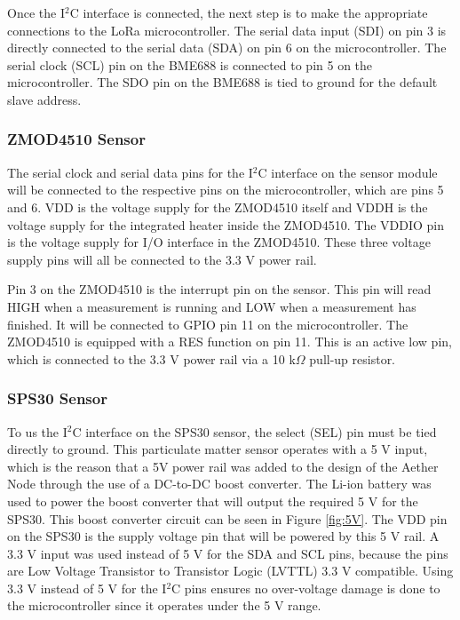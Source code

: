 \documentclass[conference]{IEEEtran}
\newcommand*{\iic}{I$^2$C\xspace}
\newcommand*{\kOhm}{k$\Omega$\xspace}
\begin{document}
 Once the \iic interface is connected, the next step is to make the appropriate connections to the LoRa microcontroller. The serial data input (SDI) on pin 3 is directly connected to the serial data (SDA) on pin 6 on the microcontroller. The serial clock (SCL) pin on the BME688 is connected to pin 5 on the microcontroller. The SDO pin on the BME688 is tied to ground for the default slave address.
 
\subsubsection{ZMOD4510 Sensor}
The serial clock and serial data pins for the \iic interface on the sensor module will be connected to the respective pins on the microcontroller, which are pins 5 and 6. VDD is the voltage supply for the ZMOD4510 itself and VDDH is the voltage supply for the integrated heater inside the ZMOD4510. The VDDIO pin is the voltage supply for I/O interface in the ZMOD4510. These three voltage supply pins will all be connected to the 3.3 V power rail. 

Pin 3 on the ZMOD4510 is the interrupt pin on the sensor. This pin will read HIGH when a measurement is running and LOW when a measurement has finished. It will be connected to GPIO pin 11 on the microcontroller. The ZMOD4510 is equipped with a RES function on pin 11. This is an active low pin, which is connected to the 3.3 V power rail via a 10 \kOhm pull-up resistor.

\subsubsection{SPS30 Sensor}
 To us the \iic interface on the SPS30 sensor, the select (SEL) pin must be tied directly to ground. This particulate matter sensor operates with a 5 V input, which is the reason that a 5V power rail was added to the design of the Aether Node through the use of a DC-to-DC boost converter. The Li-ion battery was used to power the boost converter that will output the required 5 V for the SPS30. This boost converter circuit can be seen in Figure \ref{fig:5V}. The VDD pin on the SPS30 is the supply voltage pin that will be powered by this 5 V rail. A 3.3 V input was used instead of 5 V for the SDA and SCL pins, because the pins are Low Voltage Transistor to Transistor Logic (LVTTL) 3.3 V compatible. Using 3.3 V instead of 5 V for the \iic pins ensures no over-voltage damage is done to the microcontroller since it operates under the 5 V range.
 
\end{document}

